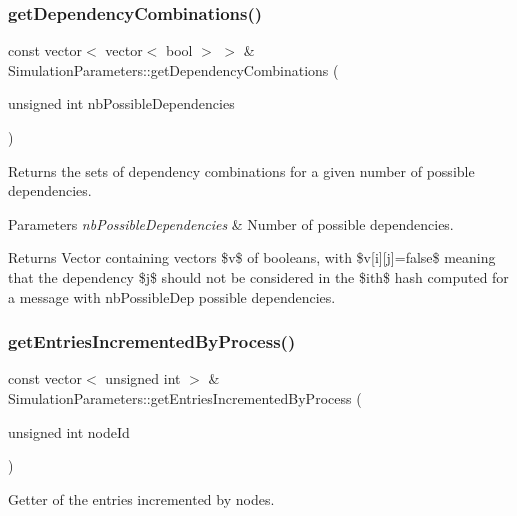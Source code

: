 \subsubsection{\texorpdfstring{get\+Dependency\+Combinations()}{getDependencyCombinations()}}
{\footnotesize\ttfamily const vector$<$ vector$<$ bool $>$ $>$ \& Simulation\+Parameters\+::get\+Dependency\+Combinations (\begin{DoxyParamCaption}\item[{unsigned int}]{nb\+Possible\+Dependencies }\end{DoxyParamCaption})}



Returns the sets of dependency combinations for a given number of possible dependencies. 


\begin{DoxyParams}{Parameters}
{\em nb\+Possible\+Dependencies} & Number of possible dependencies. \\
\hline
\end{DoxyParams}
\begin{DoxyReturn}{Returns}
Vector containing vectors \$v\$ of booleans, with \$v\mbox{[}i\mbox{]}\mbox{[}j\mbox{]}=false\$ meaning that the dependency \$j\$ should not be considered in the \$ith\$ hash computed for a message with nb\+Possible\+Dep possible dependencies. 
\end{DoxyReturn}
\mbox{\label{class_simulation_parameters_aa8a52acbc3c5d374decafb59dcf0e971}} 
\subsubsection{\texorpdfstring{get\+Entries\+Incremented\+By\+Process()}{getEntriesIncrementedByProcess()}}
{\footnotesize\ttfamily const vector$<$ unsigned int $>$ \& Simulation\+Parameters\+::get\+Entries\+Incremented\+By\+Process (\begin{DoxyParamCaption}\item[{unsigned int}]{node\+Id }\end{DoxyParamCaption})}



Getter of the entries incremented by nodes. 



